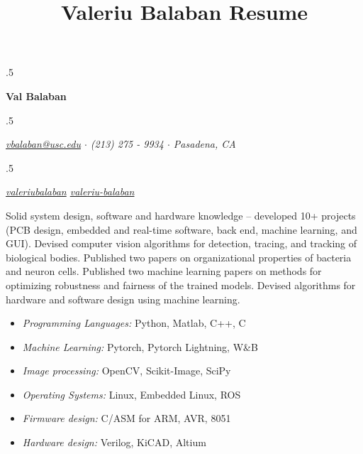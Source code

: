 \documentclass[11pt]{res}
\title{Valeriu Balaban Resume}
\begin{document}
\thispagestyle{fancy}

\moveleft.5\hoffset\centerline{\textbf{\Huge Val Balaban}}
\vspace{2mm}

\moveleft.5\hoffset\centerline{ \textit{\href{mailto:vbalaban@usc.edu}{vbalaban@usc.edu} \enskip $\cdot$ \enskip (213) 275 - 9934 \enskip $\cdot$ \enskip Pasadena, CA }}

\moveleft.5\hoffset\centerline{\textit{\href{https://www.linkedin.com/in/valeriubalaban}{ valeriubalaban}  \enskip \enskip \enskip \href{https://github.com/valeriu-balaban}{ valeriu-balaban}}}


\begin{resume}
\vspace{-12mm}

\begin{tcolorbox}[boxrule=0.5pt, colback=black!3!white]

    Solid system design, software and hardware knowledge -- developed 10+ projects (PCB design, embedded and real-time software, back end, machine learning, and GUI). Devised computer vision algorithms for detection, tracing, and tracking of biological bodies. Published two papers on organizational properties of bacteria and neuron cells. Published two machine learning papers on methods for optimizing robustness and fairness of the trained models. Devised algorithms for hardware and software design using machine learning. 

    \vspace{-2mm}
    \begin{multicols}{2}
    \begin{itemize}[label={\footnotesize {}}]   
        \setlength{\itemsep}{-0.0em}
        \item \textit{Programming Languages:} {\selectfont \footnotesize Python, Matlab, C++, C}
        \item \textit{Machine Learning:}  {\selectfont \footnotesize Pytorch, Pytorch Lightning, W\&B}
        \item \textit{Image processing:} {\selectfont \footnotesize OpenCV, Scikit-Image, SciPy}
        \item \textit{Operating Systems:} {\selectfont \footnotesize Linux, Embedded Linux, ROS}
        \item \textit{Firmware design:} {\selectfont \footnotesize C/ASM for ARM, AVR, 8051}
        \item \textit{Hardware design:} {\selectfont \footnotesize Verilog, KiCAD, Altium}
    \end{itemize}
    \end{multicols}
    \vspace{-4mm}
\end{tcolorbox}


\end{resume}
\end{document}
